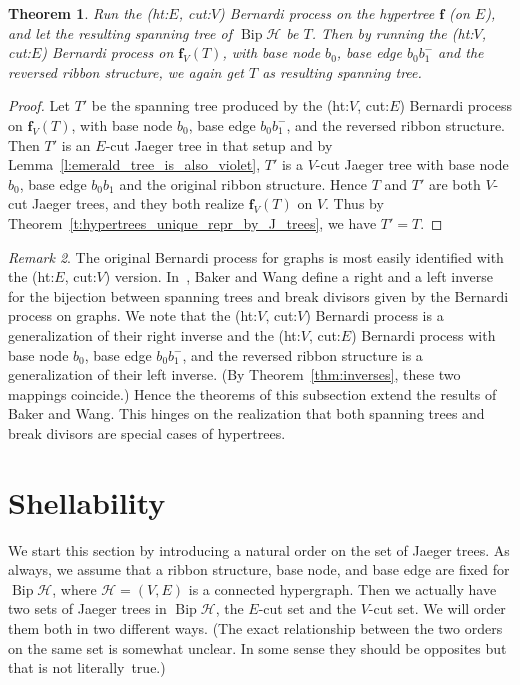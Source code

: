 \documentclass[10pt]{amsart}
\newtheorem{theo}{Theorem}[section]
\theoremstyle{definition}\newtheorem{defi}[theo]{Definition}
\theoremstyle{remark}\newtheorem{rema}[theo]{Remark}
\newcommand{\HH}{\mathcal H}
\DeclareMathOperator{\bip}{Bip}
\begin{document}
\begin{theo}
Run the (ht:$E$, cut:$V$) Bernardi process on the hypertree $\mathbf f$ (on $E$), and let the resulting spanning tree of $\bip \HH$ be $T$. Then by running the (ht:$V$, cut:$E$) Bernardi process on $\mathbf f_V(T)$, with base node $b_0$, base edge $b_0b_1^-$ and the reversed ribbon structure, we again get $T$ as resulting spanning tree.
\end{theo}

\begin{proof}
Let $T'$ be the spanning tree produced by the (ht:$V$, cut:$E$) Bernardi process on $\mathbf f_V(T)$, with base node $b_0$, base edge $b_0b_1^-$, and the reversed ribbon structure. Then $T'$ is an $E$-cut Jaeger tree in that setup and by Lemma~\ref{l:emerald_tree_is_also_violet}, $T'$ is a $V$-cut Jaeger tree with base node $b_0$, base edge $b_0b_1$ and the original ribbon structure. Hence $T$ and $T'$ are both $V$-cut Jaeger trees, and they both realize $\mathbf f_V(T)$ on $V$. Thus by Theorem~\ref{t:hypertrees_unique_repr_by_J_trees}, we have $T'=T$.
\end{proof}

\begin{rema}\label{rem:Bernardi_altalanosit_BW}
The original Bernardi process for graphs is most easily identified with the (ht:$E$, cut:$V$) version. In~\cite{Baker-Wang}, Baker and Wang define a right and a left inverse for the bijection between spanning trees and break divisors given by the Bernardi process on graphs. We note that the (ht:$V$, cut:$V$) Bernardi process is a generalization of their right inverse and the (ht:$V$, cut:$E$) Bernardi process with base node $b_0$, base edge $b_0b_1^-$, and the reversed ribbon structure is a generalization of their left inverse. (By Theorem~\ref{thm:inverses}, these two mappings coincide.) Hence the theorems of this subsection extend the results of Baker and Wang. This hinges on the realization that both spanning trees and break divisors are special cases of hypertrees.
\end{rema}



\section{Shellability}
\label{sec:shelling}

We start this section by introducing a natural order on the set of Jaeger trees. As always, we assume that a ribbon structure, base node, and base edge are fixed for $\bip\HH$, where $\HH = (V,E)$ is a connected hypergraph. Then we actually have two sets of Jaeger trees in $\bip\HH$, the $E$-cut set and the $V$-cut set. We will order them both in two different ways. (The exact relationship between the two orders on the same set is somewhat unclear. In some sense they should be opposites but that is not literally~true.)
\end{document}
